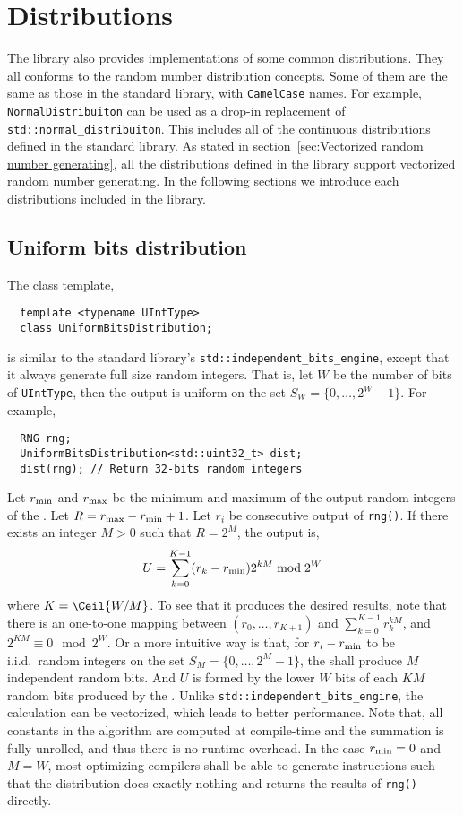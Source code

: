 \section{Distributions}
\label{sec:Distributions}

The library also provides implementations of some common distributions. They
all conforms to the \cppoo random number distribution concepts. Some of them
are the same as those in the \cppoo standard library, with \verb|CamelCase|
names. For example, \verb|NormalDistribuiton| can be used as a drop-in
replacement of \verb|std::normal_distribuiton|. This includes all of the
continuous distributions defined in the standard library. As stated in
section~\ref{sec:Vectorized random number generating}, all the distributions
defined in the library support vectorized random number generating. In the
following sections we introduce each distributions included in the library.

\subsection{Uniform bits distribution}
\label{sub:Uniform bits distribution}

The class template,
\begin{Verbatim}
  template <typename UIntType>
  class UniformBitsDistribution;
\end{Verbatim}
is similar to the standard library's \verb|std::independent_bits_engine|,
except that it always generate full size random integers. That is, let $W$ be
the number of bits of \verb|UIntType|, then the output is uniform on the set
$S_W = \{0,\dots,2^W - 1\}$. For example,
\begin{Verbatim}
  RNG rng;
  UniformBitsDistribution<std::uint32_t> dist;
  dist(rng); // Return 32-bits random integers
\end{Verbatim}
Let $r_{\mathrm{min}}$ and $r_{\mathrm{max}}$ be the minimum and maximum of the output random
integers of the \rng. Let $R = r_{\mathrm{max}} - r_{\mathrm{min}} + 1$. Let $r_i$ be consecutive
output of \verb|rng()|. If there exists an integer $M > 0$ such that $R = 2^M$,
the output is,
\begin{equation*}
  U = \sum_{k = 0}^{K - 1} (r_k - r_{\mathrm{min}}) 2^{kM} \bmod 2^W
\end{equation*}
where $K = \Ceil{W / M}$. To see that it produces the desired results, note
that there is an one-to-one mapping between $(r_0,\dots,r_{K + 1})$ and
$\sum_{k=0}^{K-1}r_k^{kM}$, and $2^{KM}\equiv0\mod2^W$. Or a more intuitive way
is that, for $r_i - r_{\mathrm{min}}$ to be i.i.d.\ random integers on the set $S_M =
\{0,\dots,2^M - 1\}$, the \rng shall produce $M$ independent random bits. And
$U$ is formed by the lower $W$ bits of each $KM$ random bits produced by the
\rng. Unlike \verb|std::independent_bits_engine|, the calculation can be
vectorized, which leads to better performance. Note that, all constants in the
algorithm are computed at compile-time and the summation is fully unrolled, and
thus there is no runtime overhead. In the case $r_{\mathrm{min}} = 0$ and $M = W$, most
optimizing compilers shall be able to generate instructions such that the
distribution does exactly nothing and returns the results of \verb|rng()|
directly.

